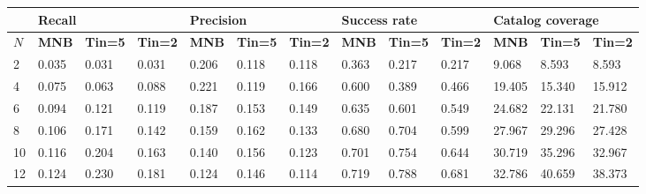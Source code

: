 \begin{table*}[]
	\small
	\begin{tabular}{|l | lll| lll |lll |lll|}
		\hline
		& \multicolumn{3}{l|}{\textbf{Recall}} & \multicolumn{3}{l|}{\textbf{Precision}} & \multicolumn{3}{l|}{\textbf{Success rate}} & \multicolumn{3}{l|}{ \textbf{Catalog coverage}} \\ \hline
		$N$  & \textbf{MNB}     & \textbf{Tin=5}   & \textbf{Tin=2}  & \textbf{MNB}      & \textbf{Tin=5 }   & \textbf{Tin=2}   & \textbf{MNB}       & \textbf{Tin=5 }   & \textbf{Tin=2}    & \textbf{MNB}        & \textbf{Tin=5 }     & \textbf{Tin=2}      \\ \hline
		2  & 0.035   & 0.031   & 0.031  & 0.206    & 0.118    & 0.118   & 0.363     & 0.217    & 0.217    & 9.068     & 8.593      & 8.593      \\ \hline
		4  & 0.075   & 0.063   & 0.088  & 0.221   & 0.119    & 0.166   &  0.600     & 0.389    & 0.466    & 19.405     & 15.340     & 15.912     \\ \hline
		6  & 0.094   & 0.121   & 0.119  & 0.187    & 0.153    & 0.149   & 0.635    & 0.601    & 0.549    &  24.682     & 22.131     & 21.780     \\ \hline
		\rowcolor{Gray}
		8  & 0.106   & 0.171   & 0.142  & 0.159  & 0.162    & 0.133   &  0.680     & 0.704    & 0.599    & 27.967     & 29.296     & 27.428     \\ \hline
		10 & 0.116   & 0.204   & 0.163  & 0.140    & 0.156    & 0.123   & 0.701     & 0.754    & 0.644    & 30.719     & 35.296     & 32.967     \\ \hline
		12 & 0.124   & 0.230   & 0.181  & 0.124    & 0.146    &  0.114   & 0.719     & 0.788    & 0.681    & 32.786     & 40.659     & 38.373     \\ \hline

\end{tabular}
\end{table*}
